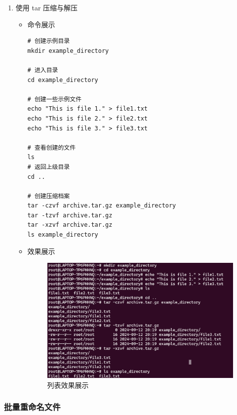 \documentclass[UTF8]{ctexart}
\begin{document}
\begin{enumerate}
  \item 使用 tar 压缩与解压
  \begin{itemize}
  \item 命令展示
  \begin{verbatim}
# 创建示例目录
mkdir example_directory

# 进入目录
cd example_directory

# 创建一些示例文件
echo "This is file 1." > file1.txt
echo "This is file 2." > file2.txt
echo "This is file 3." > file3.txt

# 查看创建的文件
ls
# 返回上级目录
cd ..

# 创建压缩档案
tar -czvf archive.tar.gz example_directory
tar -tzvf archive.tar.gz
tar -xzvf archive.tar.gz
ls example_directory

  \end{verbatim}
\item 效果展示
  \begin{figure}[H]
    \centering
    \includegraphics[width=\textwidth]{19} %
    \caption{列表效果展示}
  \end{figure}
  \end{itemize}
\end{enumerate}

\subsubsection{ 批量重命名文件}
\end{document}
